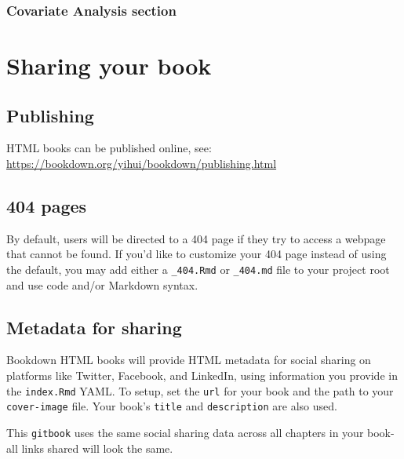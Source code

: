 \documentclass[
]{book}
\begin{document}
\hypertarget{covariate-analysis-section-1}{%
\subsection{Covariate Analysis section}\label{covariate-analysis-section-1}}

\hypertarget{section}{%
\chapter{}\label{section}}

\hypertarget{sharing-your-book}{%
\chapter{Sharing your book}\label{sharing-your-book}}

\hypertarget{publishing}{%
\section{Publishing}\label{publishing}}

HTML books can be published online, see: \url{https://bookdown.org/yihui/bookdown/publishing.html}

\hypertarget{pages}{%
\section{404 pages}\label{pages}}

By default, users will be directed to a 404 page if they try to access a webpage that cannot be found. If you'd like to customize your 404 page instead of using the default, you may add either a \texttt{\_404.Rmd} or \texttt{\_404.md} file to your project root and use code and/or Markdown syntax.

\hypertarget{metadata-for-sharing}{%
\section{Metadata for sharing}\label{metadata-for-sharing}}

Bookdown HTML books will provide HTML metadata for social sharing on platforms like Twitter, Facebook, and LinkedIn, using information you provide in the \texttt{index.Rmd} YAML. To setup, set the \texttt{url} for your book and the path to your \texttt{cover-image} file. Your book's \texttt{title} and \texttt{description} are also used.

This \texttt{gitbook} uses the same social sharing data across all chapters in your book- all links shared will look the same.
\end{document}
